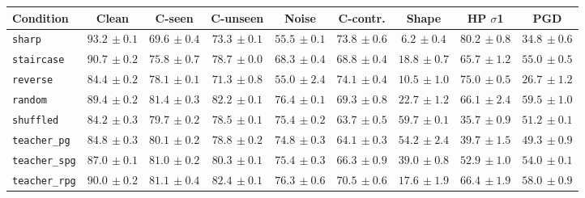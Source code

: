 \begin{tabular}{lcccccccc}
\hline
Condition & Clean & C-seen & C-unseen & Noise & C-contr. & Shape & HP $\sigma$1 & PGD \\
\hline
\texttt{sharp} & $93.2{\scriptstyle\,\pm0.1}$ & $69.6{\scriptstyle\,\pm0.4}$ & $73.3{\scriptstyle\,\pm0.1}$ & $55.5{\scriptstyle\,\pm0.1}$ & $73.8{\scriptstyle\,\pm0.6}$ & $6.2{\scriptstyle\,\pm0.4}$ & $80.2{\scriptstyle\,\pm0.8}$ & $34.8{\scriptstyle\,\pm0.6}$ \\
\texttt{staircase} & $90.7{\scriptstyle\,\pm0.2}$ & $75.8{\scriptstyle\,\pm0.7}$ & $78.7{\scriptstyle\,\pm0.0}$ & $68.3{\scriptstyle\,\pm0.4}$ & $68.8{\scriptstyle\,\pm0.4}$ & $18.8{\scriptstyle\,\pm0.7}$ & $65.7{\scriptstyle\,\pm1.2}$ & $55.0{\scriptstyle\,\pm0.5}$ \\
\texttt{reverse} & $84.4{\scriptstyle\,\pm0.2}$ & $78.1{\scriptstyle\,\pm0.1}$ & $71.3{\scriptstyle\,\pm0.8}$ & $55.0{\scriptstyle\,\pm2.4}$ & $74.1{\scriptstyle\,\pm0.4}$ & $10.5{\scriptstyle\,\pm1.0}$ & $75.0{\scriptstyle\,\pm0.5}$ & $26.7{\scriptstyle\,\pm1.2}$ \\
\texttt{random} & $89.4{\scriptstyle\,\pm0.2}$ & $81.4{\scriptstyle\,\pm0.3}$ & $82.2{\scriptstyle\,\pm0.1}$ & $76.4{\scriptstyle\,\pm0.1}$ & $69.3{\scriptstyle\,\pm0.8}$ & $22.7{\scriptstyle\,\pm1.2}$ & $66.1{\scriptstyle\,\pm2.4}$ & $59.5{\scriptstyle\,\pm1.0}$ \\
\texttt{shuffled} & $84.2{\scriptstyle\,\pm0.3}$ & $79.7{\scriptstyle\,\pm0.2}$ & $78.5{\scriptstyle\,\pm0.1}$ & $75.4{\scriptstyle\,\pm0.2}$ & $63.7{\scriptstyle\,\pm0.5}$ & $59.7{\scriptstyle\,\pm0.1}$ & $35.7{\scriptstyle\,\pm0.9}$ & $51.2{\scriptstyle\,\pm0.1}$ \\
\texttt{teacher\_pg} & $84.8{\scriptstyle\,\pm0.3}$ & $80.1{\scriptstyle\,\pm0.2}$ & $78.8{\scriptstyle\,\pm0.2}$ & $74.8{\scriptstyle\,\pm0.3}$ & $64.1{\scriptstyle\,\pm0.3}$ & $54.2{\scriptstyle\,\pm2.4}$ & $39.7{\scriptstyle\,\pm1.5}$ & $49.3{\scriptstyle\,\pm0.9}$ \\
\texttt{teacher\_spg} & $87.0{\scriptstyle\,\pm0.1}$ & $81.0{\scriptstyle\,\pm0.2}$ & $80.3{\scriptstyle\,\pm0.1}$ & $75.4{\scriptstyle\,\pm0.3}$ & $66.3{\scriptstyle\,\pm0.9}$ & $39.0{\scriptstyle\,\pm0.8}$ & $52.9{\scriptstyle\,\pm1.0}$ & $54.0{\scriptstyle\,\pm0.1}$ \\
\texttt{teacher\_rpg} & $90.0{\scriptstyle\,\pm0.2}$ & $81.1{\scriptstyle\,\pm0.4}$ & $82.4{\scriptstyle\,\pm0.1}$ & $76.3{\scriptstyle\,\pm0.6}$ & $70.5{\scriptstyle\,\pm0.6}$ & $17.6{\scriptstyle\,\pm1.9}$ & $66.4{\scriptstyle\,\pm1.9}$ & $58.0{\scriptstyle\,\pm0.9}$ \\

\end{tabular}
